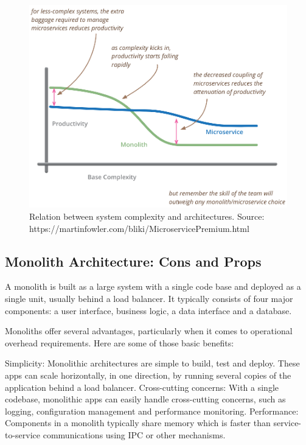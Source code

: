 \begin{figure}[H]
    \centering
    \includegraphics[width=1\textwidth]{monolith_vs_microservice}
    \caption{Relation between system complexity and architectures. Source: https://martinfowler.com/bliki/MicroservicePremium.html}
    \label{fig:monolith_vs_microservice}
\end{figure}

\subsection{Monolith Architecture: Cons and Props}\label{subsec:monolith-architecture:-cons-and-props}

A monolith is built as a large system with a single code base and deployed as a single unit, usually behind a load balancer.
It typically consists of four major components: a user interface, business logic, a data interface and a database.

Monoliths offer several advantages, particularly when it comes to operational overhead requirements.
Here are some of those basic benefits:

Simplicity: Monolithic architectures are simple to build, test and deploy.
These apps can scale horizontally, in one direction, by running several copies of the application behind a load balancer.
Cross-cutting concerns: With a single codebase, monolithic apps can easily handle cross-cutting concerns, such as logging,
configuration management and performance monitoring.
Performance: Components in a monolith typically share memory which is faster than service-to-service communications using IPC or other mechanisms.

